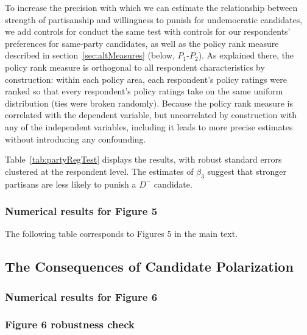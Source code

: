 \documentclass[12pt]{article}
\begin{document}
To increase the precision with which we can estimate the relationship between strength of partisanship and willingness to punish for undemocratic candidates, we add controls for conduct the same test with controls for our respondents' preferences for same-party candidates, as well as the policy rank measure described in section~\ref{sec:altMeasures} (below, $P_1$-$P_2$). As explained there, the policy rank measure is orthogonal to all respondent characteristics by construction: within each policy area, each respondent's policy ratings were ranked so that every respondent's policy ratings take on the same uniform distribution (ties were broken randomly). Because the policy rank measure is correlated with the dependent variable, but uncorrelated by construction with any of the independent variables, including it leads to more precise estimates without introducing any confounding.

Table~\ref{tab:partyRegTest} displays the results, with robust standard errors clustered at the respondent level. The estimates of $\beta_3$ suggest that stronger partisans are less likely to punish a $D^-$ candidate.

\singlespacing



\clearpage
\newpage

\subsubsection{Numerical results for Figure 5}

The following table corresponds to Figures 5 in the main text.



\clearpage


\subsection{The Consequences of Candidate Polarization}

\subsubsection{Numerical results for Figure 6}



\subsubsection{Figure 6 robustness check}
\end{document}
